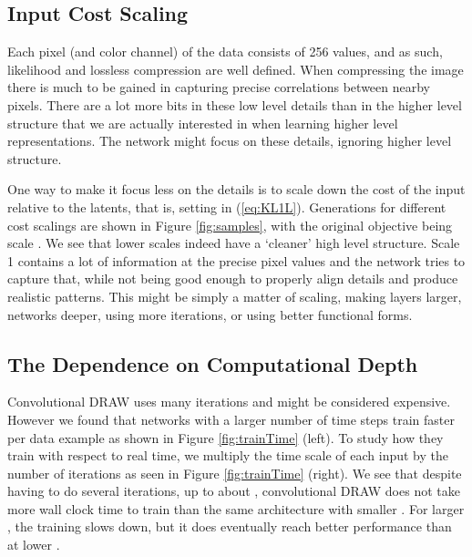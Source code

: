\documentclass{article}
\begin{document}
\subsection{Input Cost Scaling}
\label{sec:inputScale}

Each pixel (and color channel) of the data consists of 256 values, and as such, likelihood and lossless compression are well defined. When compressing the image there is much to be gained in capturing precise correlations between nearby pixels. There are a lot more bits in these low level details than in the  higher level structure that we are actually interested in when learning higher level representations. The network might focus on these details, ignoring higher level structure. 

One way to make it focus less on the details is to scale down the cost of the input relative to the latents, that is, setting  in (\ref{eq:KL1L}). Generations for different cost scalings are shown in Figure \ref{fig:samples}, with the original objective being scale . We see that lower scales indeed have a `cleaner' high level structure. Scale 1 contains a lot of information at the precise pixel values and the network tries to capture that, while not being good enough to properly align details and produce realistic patterns. 
This might be simply a matter of scaling, making layers larger, networks deeper, using more iterations, or using better functional forms. 






\subsection{The Dependence on Computational Depth}

Convolutional DRAW uses many iterations and might be considered expensive. However we found that networks with a larger number of time steps train faster per data example as shown in Figure \ref{fig:trainTime} (left). To study how they train with respect to real time, we multiply the time scale of each input by the number of iterations as seen in Figure \ref{fig:trainTime} (right). We see that despite having to do several iterations, up to about , convolutional DRAW does not take more wall clock time to train than the same architecture with smaller . For larger , the training slows down, but it does eventually reach better performance than at lower . 
\end{document}
